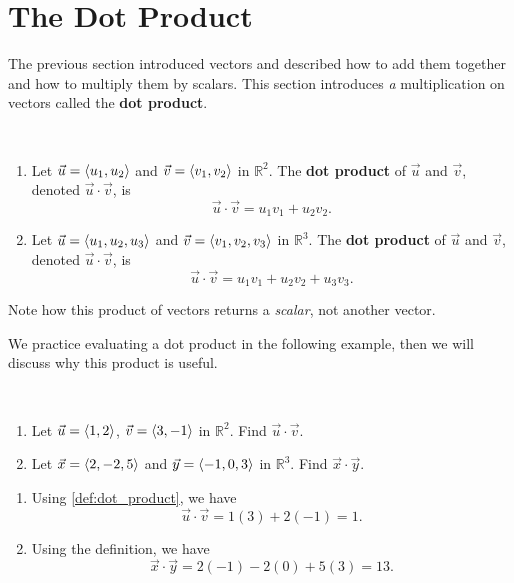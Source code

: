 \section{The Dot Product}\label{sec:dot_product}

The previous section introduced vectors and described how to add them together and how to multiply them by scalars. This section introduces \emph{a} multiplication on vectors called the \textbf{dot product}.

\begin{definition}\label{def:dot_product}%
\mbox{}\\[-2\baselineskip]\parbox[t]{\linewidth}{\begin{enumerate}
	\item Let $\vec u =\left\langle u_1,u_2\right\rangle$ and $\vec v = \left\langle v_1,v_2\right\rangle$  in $\mathbb{R}^2$. The \textbf{dot product} of $\vec u$ and $\vec v$, denoted $\vec u\cdot\vec v$, is 
	\[\vec u\cdot\vec v = u_1v_1+u_2v_2.\]
	\item Let $\vec u = \left\langle u_1,u_2,u_3\right\rangle$ and $\vec v = \left\langle v_1,v_2,v_3\right\rangle$  in $\mathbb{R}^3$. The \textbf{dot product} of $\vec u$ and $\vec v$, denoted $\vec u\cdot \vec v$, is 
	\[\vec u\cdot\vec v = u_1v_1+u_2v_2+u_3v_3.\]
\end{enumerate}}
\end{definition}

Note how this product of vectors returns a \emph{scalar}, not another vector.

We practice evaluating a dot product in the following example, then we will discuss why this product is useful.

\begin{example}\label{ex_dotp1}%
\mbox{}\\[-2\baselineskip]\parbox[t]{\linewidth}{%
\begin{enumerate}
	\item Let $\vec u=\left\langle 1,2\right\rangle$, $\vec v=\left\langle 3,-1\right\rangle$ in $\mathbb{R}^2$. Find $\vec u\cdot\vec v$.
	\item Let $\vec x = \left\langle 2,-2,5\right\rangle$ and $\vec y = \left\langle -1, 0, 3\right\rangle$ in $\mathbb{R}^3$. Find $\vec x\cdot\vec y$.
\end{enumerate}}\vspace{0pt}
\solution
\begin{enumerate}
	\item Using \autoref{def:dot_product}, we have
	\[\vec u\cdot\vec v = 1(3)+2(-1) = 1.\]
	\item	Using the definition, we have
	\[\vec x\cdot\vec y = 2(-1)  -2(0) + 5(3) = 13.\]
\end{enumerate}
\end{example}


